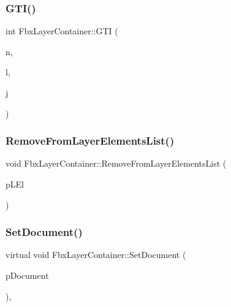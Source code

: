 \mbox{\label{class_fbx_layer_container_a8b96ebd4871a4c169e39fa7d8df3c48d}} 
\subsubsection{\texorpdfstring{G\+T\+I()}{GTI()}}
{\footnotesize\ttfamily int Fbx\+Layer\+Container\+::\+G\+TI (\begin{DoxyParamCaption}\item[{const char $\ast$}]{n,  }\item[{\hyperlink{fbxtypes_8h_ae9fb141d8158a730aa85ec5ff2ea3f6b}{Fbx\+U\+Int}}]{l,  }\item[{int}]{j }\end{DoxyParamCaption})}

\mbox{\label{class_fbx_layer_container_a2202d8a3b1d6a442cd0424bfcd25aebe}} 
\subsubsection{\texorpdfstring{Remove\+From\+Layer\+Elements\+List()}{RemoveFromLayerElementsList()}}
{\footnotesize\ttfamily void Fbx\+Layer\+Container\+::\+Remove\+From\+Layer\+Elements\+List (\begin{DoxyParamCaption}\item[{\hyperlink{class_fbx_layer_element}{Fbx\+Layer\+Element} $\ast$}]{p\+L\+El }\end{DoxyParamCaption})}

\mbox{\label{class_fbx_layer_container_a1743b1727b9f522d69bbf0d65c2a5073}} 
\subsubsection{\texorpdfstring{Set\+Document()}{SetDocument()}}
{\footnotesize\ttfamily virtual void Fbx\+Layer\+Container\+::\+Set\+Document (\begin{DoxyParamCaption}\item[{\hyperlink{class_fbx_document}{Fbx\+Document} $\ast$}]{p\+Document }\end{DoxyParamCaption})\hspace{0.3cm}{\ttfamily [protected]}, {\ttfamily [virtual]}}



